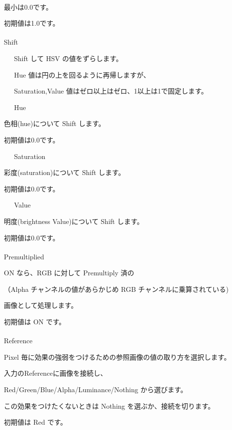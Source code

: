 \documentclass[a4paper,12pt]{article}
\begin{document}
\newpage

\thispagestyle{empty}

\ \vspace{-0.2em}
\par
最小は0.0です。\par
初期値は1.0です。\\
\\
Shift\par
\noindent \ \ \, Shift して HSV の値をずらします。\par
\noindent \ \ \, Hue 値は円の上を回るように再帰しますが、\par
\noindent \ \ \, Saturation,Value 値はゼロ以上はゼロ、1以上は1で固定します。\\
\par
\noindent \ \ \, Hue\par
色相(hue)について Shift します。\par
初期値は0.0です。\par
\noindent \ \ \, Saturation\par
彩度(saturation)について Shift します。\par
初期値は0.0です。\par
\noindent \ \ \, Value\par
明度(brightness Value)について Shift します。\par
初期値は0.0です。\\
\\
Premultiplied\par
ON なら、RGB に対して Premultiply 済の\par
（Alpha チャンネルの値があらかじめ RGB チャンネルに乗算されている)\par
画像として処理します。\par
初期値は ON です。\\
\\
Reference\par
Pixel 毎に効果の強弱をつけるための参照画像の値の取り方を選択します。\par
入力の\textquotedbl Reference\textquotedbl に画像を接続し、\par
Red/Green/Blue/Alpha/Luminance/Nothing から選びます。\par
この効果をつけたくないときは Nothing を選ぶか、接続を切ります。\par
初期値は Red です。
\end{document}
